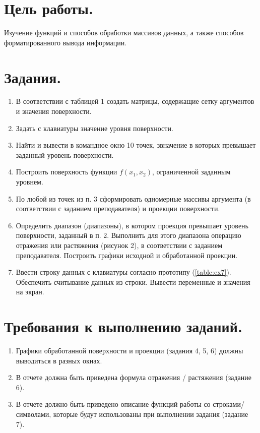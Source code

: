 \section*{Цель работы.}
Изучение функций и способов обработки массивов данных, а также способов форматированного вывода информации.

\section*{Задания.}
\begin{enumerate}
    \item В соответствии с таблицей 1 создать матрицы, содержащие сетку аргументов и значения поверхности.
    \item Задать с клавиатуры значение уровня поверхности.
    \item Найти и вывести в командное окно 10 точек, звначение в которых превышает заданный уровень поверхности.
    \item Построить поверхность функции $f(x_1,x_2)$, ограниченной заданным уровнем.
    \item По любой из точек из п. 3 сформировать одномерные массивы аргумента (в соответствии с заданием преподавателя) и проекции поверхности.
    \item Определить диапазон (диапазоны), в котором проекция превышает уровень поверхности, заданный в п. 2. Выполнить для этого диапазона операцию отражения или растяжения (рисунок 2), в соответствии с заданием преподавателя. Построить графики исходной и обработанной проекции.
    \item Ввести строку данных с клавиатуры согласно прототипу (\cref{table:ex7}). Обеспечить считывание данных из строки. Вывести переменные и значения на экран.
\end{enumerate}

\section*{Требования к выполнению заданий.}
\begin{enumerate}
    \item Графики обработанной поверхности и проекции (задания 4, 5, 6) должны выводиться в разных окнах.
    \item В отчете должна быть приведена формула отражения / растяжения (задание 6).
    \item В отчете должно быть приведено описание функций работы со строками/символами, которые будут использованы при выполнении задания (задание 7).
\end{enumerate}



